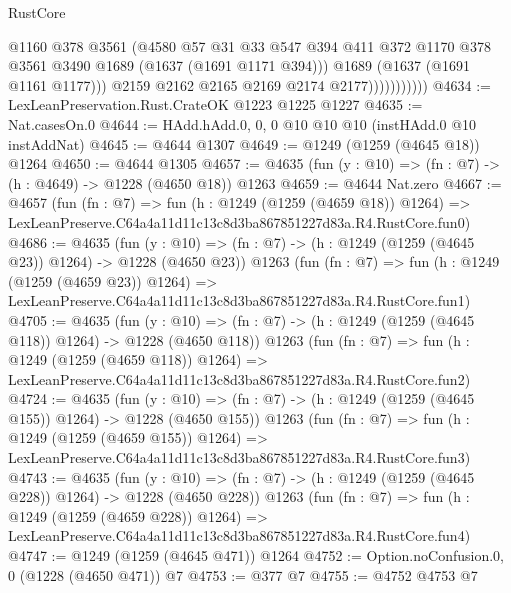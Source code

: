 \begin{lexlean}{RustCore}
\begin{coremodule}
                            @1160
                            @378
                            @3561
                            (@4580
                              @57
                              @31
                              @33
                              @547
                              @394
                              @411
                              @372
                              @1170
                              @378
                              @3561
                              @3490
                              @1689
                              (@1637 (@1691 @1171 @394)))
                            @1689
                            (@1637 (@1691 @1161 @1177)))
                          @2159
                          @2162
                          @2165
                          @2169
                          @2174
                          @2177)))))))))))
@4634 := LexLeanPreservation.Rust.CrateOK @1223 @1225 @1227
@4635 := Nat.casesOn.{0}
@4644 := HAdd.hAdd.{0, 0, 0} @10 @10 @10 (instHAdd.{0} @10 instAddNat)
@4645 := @4644 @1307
@4649 := @1249 (@1259 (@4645 @18)) @1264
@4650 := @4644 @1305
@4657 := @4635 (fun (y : @10) => (fn : @7) -> (h : @4649) -> @1228 (@4650 @18)) @1263
@4659 := @4644 Nat.zero
@4667 := @4657
    (fun (fn : @7) =>
    fun (h : @1249 (@1259 (@4659 @18)) @1264) =>
    LexLeanPreserve.C64a4a11d11c13c8d3ba867851227d83a.R4.RustCore.fun0)
@4686 := @4635
    (fun (y : @10) => (fn : @7) -> (h : @1249 (@1259 (@4645 @23)) @1264) -> @1228 (@4650 @23))
    @1263
    (fun (fn : @7) =>
    fun (h : @1249 (@1259 (@4659 @23)) @1264) =>
    LexLeanPreserve.C64a4a11d11c13c8d3ba867851227d83a.R4.RustCore.fun1)
@4705 := @4635
    (fun (y : @10) => (fn : @7) -> (h : @1249 (@1259 (@4645 @118)) @1264) -> @1228 (@4650 @118))
    @1263
    (fun (fn : @7) =>
    fun (h : @1249 (@1259 (@4659 @118)) @1264) =>
    LexLeanPreserve.C64a4a11d11c13c8d3ba867851227d83a.R4.RustCore.fun2)
@4724 := @4635
    (fun (y : @10) => (fn : @7) -> (h : @1249 (@1259 (@4645 @155)) @1264) -> @1228 (@4650 @155))
    @1263
    (fun (fn : @7) =>
    fun (h : @1249 (@1259 (@4659 @155)) @1264) =>
    LexLeanPreserve.C64a4a11d11c13c8d3ba867851227d83a.R4.RustCore.fun3)
@4743 := @4635
    (fun (y : @10) => (fn : @7) -> (h : @1249 (@1259 (@4645 @228)) @1264) -> @1228 (@4650 @228))
    @1263
    (fun (fn : @7) =>
    fun (h : @1249 (@1259 (@4659 @228)) @1264) =>
    LexLeanPreserve.C64a4a11d11c13c8d3ba867851227d83a.R4.RustCore.fun4)
@4747 := @1249 (@1259 (@4645 @471)) @1264
@4752 := Option.noConfusion.{0, 0} (@1228 (@4650 @471)) @7
@4753 := @377 @7
@4755 := @4752 @4753 @7

\end{coremodule}
\end{lexlean}
